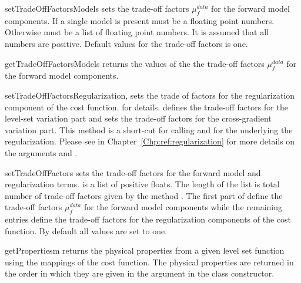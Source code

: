         
\begin{methoddesc}[InversionCostFunction]{setTradeOffFactorsModels}{}
sets the trade-off factors  $\mu^{data}_{f}$ for the forward model components.
If a single model is present  must be a floating point numbers. Otherwise
 must be a list of floating point numbers. It is assumed that all 
numbers are positive. Default values for the trade-off factors is one.
\end{methoddesc}

\begin{methoddesc}[InversionCostFunction]{getTradeOffFactorsModels}{}
returns the values of the the trade-off factors  $\mu^{data}_{f}$ for the forward model components.
\end{methoddesc}

           
\begin{methoddesc}[InversionCostFunction]{setTradeOffFactorsRegularization}{, }
sets the trade of factors for the regularization component of the cost function.
for details.  defines the trade-off factors for the level-set variation part and 
 sets the trade-off factors for the cross-gradient variation part. 
This method is a short-cut for calling  and
 for the underlying the regularization. 
Please see  in Chapter~\ref{Chp:ref:regularization} for more details
on the arguments  and .
\end{methoddesc}
        
\begin{methoddesc}[InversionCostFunction]{setTradeOffFactors}{}
sets the trade-off factors for the forward model and regularization
terms.  is a list of positive floats. The length of the list 
is total number of trade-off factors given by the method . The
first part of  define the trade-off factors  $\mu^{data}_{f}$ for the forward model components
while the remaining entries define the trade-off factors for the regularization components of the 
cost function. By default all values are set to one. 
\end{methoddesc}

\begin{methoddesc}[InversionCostFunction]{getProperties}{m}
returns the physical properties from a given level set function 
using the mappings of the cost function. The physical properties are 
returned in the order in which they are given in the  argument
in the class constructor.
\end{methoddesc}

